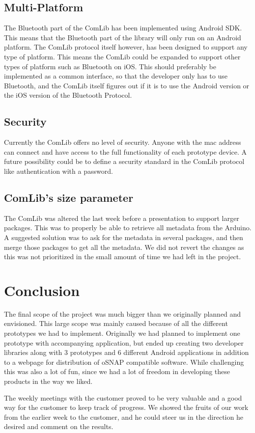 \subsection{Multi-Platform}
The Bluetooth part of the ComLib has been implemented using Android SDK. This means that 
the Bluetooth part of the library will only run on an Android platform. The ComLib protocol
itself however, has been designed to support any type of platform. This means the ComLib
could be expanded to support other types of platform such as Bluetooth on iOS. This
should preferably be implemented as a common interface, so that the developer only has to use
Bluetooth, and the ComLib itself figures out if it is to use the Android version or the iOS version of
the Bluetooth Protocol.

\subsection{Security}
Currently the ComLib offers no level of security. Anyone with the mac address can connect
and have access to the full functionality of each prototype device. A future possibility could
be to define a security standard in the ComLib protocol like authentication with a password.

\subsection{ComLib's size parameter}
The ComLib was altered the last week before a presentation to support larger packages. This was to properly
be able to retrieve all metadata from the Arduino. A suggested solution was to ask for the metadata
in several packages, and then merge those packages to get all the metadata. We did not revert the changes
as this was not prioritized in the small amount of time we had left in the project.

\section{Conclusion}
The final scope of the project was much bigger than we originally planned and envisioned. This large scope
was mainly caused because of all the different prototypes we had to implement. Originally we had planned
to implement one prototype with accompanying application, but ended up creating two developer libraries
along with 3 prototypes and 6 different Android applications in addition to a webpage for distribution of oSNAP
compatible software. While challenging this was also a lot of fun, since we had a lot of freedom in developing
these products in the way we liked.

The weekly meetings with the customer proved to be very valuable and
a good way for the customer to keep track of progress. We showed the fruits of our work from the earlier
week to the customer, and he could steer us in the direction he desired and comment on the results.
